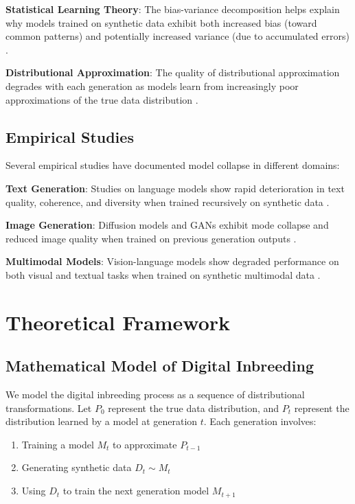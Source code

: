 \documentclass{article}
\begin{document}
\textbf{Statistical Learning Theory}: The bias-variance decomposition helps explain why models trained on synthetic data exhibit both increased bias (toward common patterns) and potentially increased variance (due to accumulated errors) \cite{hastie2009elements}.

\textbf{Distributional Approximation}: The quality of distributional approximation degrades with each generation as models learn from increasingly poor approximations of the true data distribution \cite{wasserman2006all}.

\subsection{Empirical Studies}

Several empirical studies have documented model collapse in different domains:

\textbf{Text Generation}: Studies on language models show rapid deterioration in text quality, coherence, and diversity when trained recursively on synthetic data \cite{alemohammad2023self}.

\textbf{Image Generation}: Diffusion models and GANs exhibit mode collapse and reduced image quality when trained on previous generation outputs \cite{borji2022pros}.

\textbf{Multimodal Models}: Vision-language models show degraded performance on both visual and textual tasks when trained on synthetic multimodal data \cite{radford2021learning}.

\section{Theoretical Framework}

\subsection{Mathematical Model of Digital Inbreeding}

We model the digital inbreeding process as a sequence of distributional transformations. Let $P_0$ represent the true data distribution, and $P_t$ represent the distribution learned by a model at generation $t$. Each generation involves:

\begin{enumerate}
\item Training a model $M_t$ to approximate $P_{t-1}$
\item Generating synthetic data $D_t \sim M_t$
\item Using $D_t$ to train the next generation model $M_{t+1}$
\end{enumerate}
\end{document}
